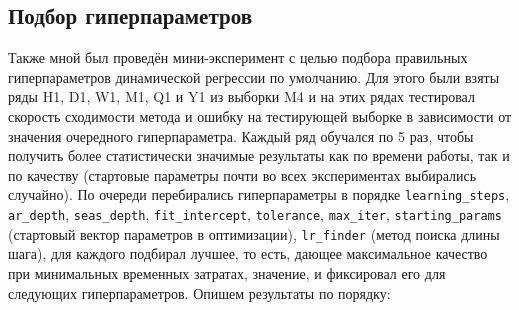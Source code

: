 \documentclass[a4paper,14pt]{extarticle}
\begin{document}
	\subsection{Подбор гиперпараметров}
	Также мной был проведён мини-эксперимент с целью подбора правильных гиперпараметров динамической регрессии по умолчанию. Для этого были взяты ряды H1, D1, W1, M1, Q1 и Y1 из выборки M4 и на этих рядах тестировал скорость сходимости метода и ошибку на тестирующей выборке в зависимости от значения очередного гиперпараметра. Каждый ряд обучался по 5 раз, чтобы получить более статистически значимые результаты как по времени работы, так и по качеству (стартовые параметры почти во всех экспериментах выбирались случайно). По очереди перебирались гиперпараметры в порядке \texttt{learning\_steps}, \texttt{ar\_depth}, \texttt{seas\_depth}, \texttt{fit\_intercept}, \texttt{tolerance}, \texttt{max\_iter}, \texttt{starting\_params} (стартовый вектор параметров в оптимизации), \texttt{lr\_finder} (метод поиска длины шага), для каждого подбирал лучшее, то есть, дающее максимальное качество при минимальных временных затратах, значение, и фиксировал его для следующих гиперпараметров. Опишем результаты по порядку:
\end{document}
